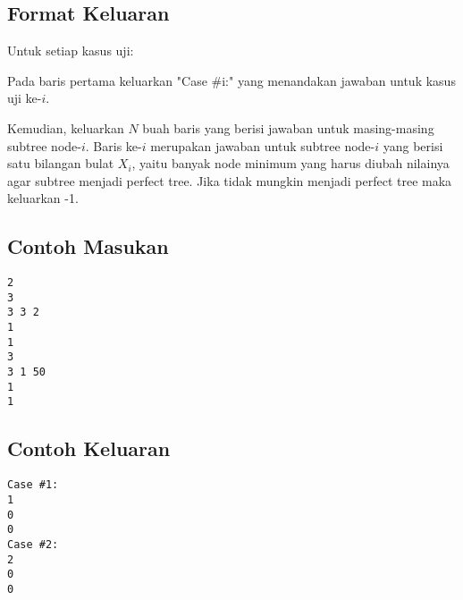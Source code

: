 \documentclass{article}
\begin{document}
\subsection*{Format Keluaran}

Untuk setiap kasus uji:

Pada baris pertama keluarkan "Case \#i:" yang menandakan jawaban untuk kasus uji ke-$i$. 

Kemudian, keluarkan $N$ buah baris yang berisi jawaban untuk masing-masing subtree node-$i$. Baris ke-$i$ merupakan jawaban untuk subtree node-$i$ yang berisi satu bilangan bulat $X_i$, yaitu banyak node minimum yang harus diubah nilainya agar subtree menjadi perfect tree. Jika tidak mungkin menjadi perfect tree maka keluarkan -1.
\\

\begin{multicols}{2}
\subsection*{Contoh Masukan}
\begin{lstlisting}
2
3
3 3 2
1
1
3
3 1 50
1
1

\end{lstlisting}
\columnbreak
\subsection*{Contoh Keluaran}
\begin{lstlisting}
Case #1:
1
0
0
Case #2:
2
0
0
\end{lstlisting}
\vfill
\null
\end{multicols}


\pagebreak
\end{document}
